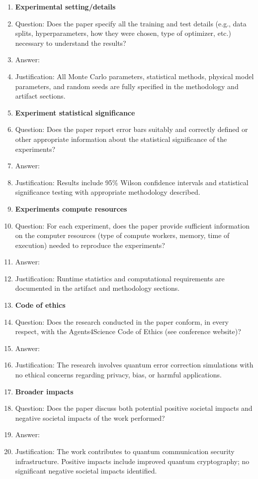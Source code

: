 \documentclass{article}
\begin{document}
\begin{enumerate}
\item {\bf Experimental setting/details}
    \item[] Question: Does the paper specify all the training and test details (e.g., data splits, hyperparameters, how they were chosen, type of optimizer, etc.) necessary to understand the results?
    \item[] Answer: \answerYes{}
    \item[] Justification: All Monte Carlo parameters, statistical methods, physical model parameters, and random seeds are fully specified in the methodology and artifact sections.

\item {\bf Experiment statistical significance}
    \item[] Question: Does the paper report error bars suitably and correctly defined or other appropriate information about the statistical significance of the experiments?
    \item[] Answer: \answerYes{}
    \item[] Justification: Results include 95\% Wilson confidence intervals and statistical significance testing with appropriate methodology described.

\item {\bf Experiments compute resources}
    \item[] Question: For each experiment, does the paper provide sufficient information on the computer resources (type of compute workers, memory, time of execution) needed to reproduce the experiments?
    \item[] Answer: \answerYes{}
    \item[] Justification: Runtime statistics and computational requirements are documented in the artifact and methodology sections.
    
\item {\bf Code of ethics}
    \item[] Question: Does the research conducted in the paper conform, in every respect, with the Agents4Science Code of Ethics (see conference website)?
    \item[] Answer: \answerYes{}
    \item[] Justification: The research involves quantum error correction simulations with no ethical concerns regarding privacy, bias, or harmful applications.

\item {\bf Broader impacts}
    \item[] Question: Does the paper discuss both potential positive societal impacts and negative societal impacts of the work performed?
    \item[] Answer: \answerYes{}
    \item[] Justification: The work contributes to quantum communication security infrastructure. Positive impacts include improved quantum cryptography; no significant negative societal impacts identified.

\end{enumerate}
\end{document}
